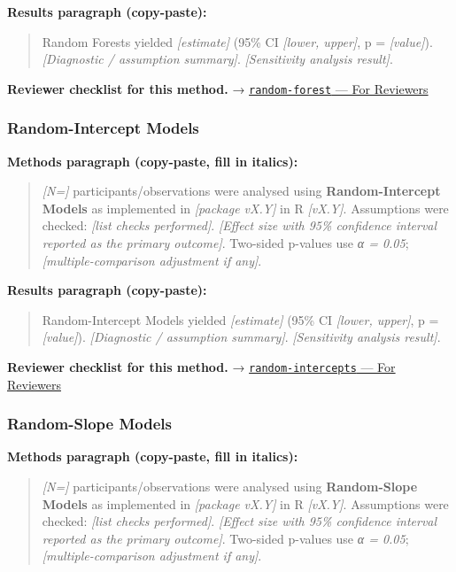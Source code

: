 \documentclass[
]{article}
\begin{document}
\textbf{Results paragraph (copy-paste):}

\begin{quote}
Random Forests yielded \emph{{[}estimate{]}} (95\% CI \emph{{[}lower,
upper{]}}, p = \emph{{[}value{]}}). \emph{{[}Diagnostic / assumption
summary{]}}. \emph{{[}Sensitivity analysis result{]}}.
\end{quote}

\textbf{Reviewer checklist for this method.} →
\href{../chapters/13-ml/random-forest.Rmd\#for-reviewers}{\texttt{random-forest}
--- For Reviewers}

\subsubsection{Random-Intercept Models}\label{random-intercept-models}

\textbf{Methods paragraph (copy-paste, fill in italics):}

\begin{quote}
\emph{{[}N={]}} participants/observations were analysed using
\textbf{Random-Intercept Models} as implemented in \emph{{[}package
vX.Y{]}} in R \emph{{[}vX.Y{]}}. Assumptions were checked: \emph{{[}list
checks performed{]}}. \emph{{[}Effect size with 95\% confidence interval
reported as the primary outcome{]}}. Two-sided p-values use \emph{α =
0.05}; \emph{{[}multiple-comparison adjustment if any{]}}.
\end{quote}

\textbf{Results paragraph (copy-paste):}

\begin{quote}
Random-Intercept Models yielded \emph{{[}estimate{]}} (95\% CI
\emph{{[}lower, upper{]}}, p = \emph{{[}value{]}}). \emph{{[}Diagnostic
/ assumption summary{]}}. \emph{{[}Sensitivity analysis result{]}}.
\end{quote}

\textbf{Reviewer checklist for this method.} →
\href{../chapters/07-regression/random-intercepts.Rmd\#for-reviewers}{\texttt{random-intercepts}
--- For Reviewers}

\subsubsection{Random-Slope Models}\label{random-slope-models}

\textbf{Methods paragraph (copy-paste, fill in italics):}

\begin{quote}
\emph{{[}N={]}} participants/observations were analysed using
\textbf{Random-Slope Models} as implemented in \emph{{[}package vX.Y{]}}
in R \emph{{[}vX.Y{]}}. Assumptions were checked: \emph{{[}list checks
performed{]}}. \emph{{[}Effect size with 95\% confidence interval
reported as the primary outcome{]}}. Two-sided p-values use \emph{α =
0.05}; \emph{{[}multiple-comparison adjustment if any{]}}.
\end{quote}
\end{document}
